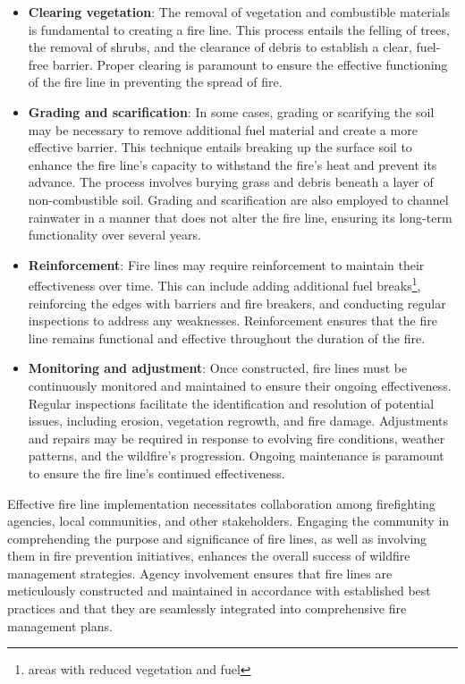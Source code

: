 \documentclass[
  12 pt,
]{Nemilov}
\begin{document}
\begin{itemize}
\item
  \textbf{Clearing vegetation}: The removal of vegetation and combustible materials is fundamental to creating a fire line. This process entails the felling of trees, the removal of shrubs, and the clearance of debris to establish a clear, fuel-free barrier. Proper clearing is paramount to ensure the effective functioning of the fire line in preventing the spread of fire.
\item
  \textbf{Grading and scarification}: In some cases, grading or scarifying the soil may be necessary to remove additional fuel material and create a more effective barrier. This technique entails breaking up the surface soil to enhance the fire line's capacity to withstand the fire's heat and prevent its advance. The process involves burying grass and debris beneath a layer of non-combustible soil. Grading and scarification are also employed to channel rainwater in a manner that does not alter the fire line, ensuring its long-term functionality over several years.
\item
  \textbf{Reinforcement}: Fire lines may require reinforcement to maintain their effectiveness over time. This can include adding additional fuel breaks\footnote{areas with reduced vegetation and fuel}, reinforcing the edges with barriers and fire breakers, and conducting regular inspections to address any weaknesses. Reinforcement ensures that the fire line remains functional and effective throughout the duration of the fire.
\item
  \textbf{Monitoring and adjustment}: Once constructed, fire lines must be continuously monitored and maintained to ensure their ongoing effectiveness. Regular inspections facilitate the identification and resolution of potential issues, including erosion, vegetation regrowth, and fire damage. Adjustments and repairs may be required in response to evolving fire conditions, weather patterns, and the wildfire's progression. Ongoing maintenance is paramount to ensure the fire line's continued effectiveness.
\end{itemize}

Effective fire line implementation necessitates collaboration among firefighting agencies, local communities, and other stakeholders. Engaging the community in comprehending the purpose and significance of fire lines, as well as involving them in fire prevention initiatives, enhances the overall success of wildfire management strategies. Agency involvement ensures that fire lines are meticulously constructed and maintained in accordance with established best practices and that they are seamlessly integrated into comprehensive fire management plans.
\end{document}

